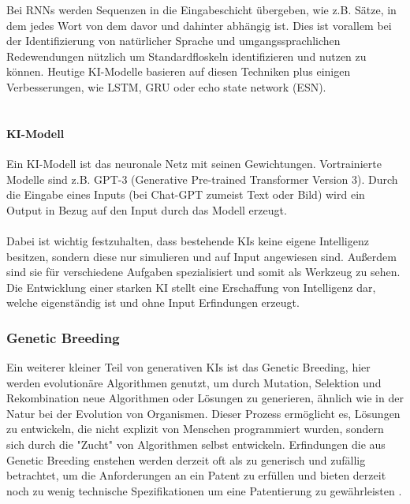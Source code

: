 Bei RNNs werden Sequenzen in die Eingabeschicht übergeben, 
wie z.B. Sätze, 
in dem jedes Wort von dem davor und dahinter abhängig ist. 
Dies ist vorallem bei der Identifizierung von natürlicher Sprache 
und umgangssprachlichen Redewendungen nützlich um  
Standardfloskeln identifizieren und nutzen zu können.
\cite{WasSindRekurrente2023}
Heutige KI-Modelle basieren auf diesen Techniken plus einigen Verbesserungen,
wie \gls{LSTM}, \gls{GRU} 
oder echo state network (ESN).
\\
\\
\paragraph{KI-Modell}
Ein KI-Modell ist das neuronale Netz mit seinen Gewichtungen. 
Vortrainierte Modelle sind z.B. GPT-3 (Generative Pre-trained Transformer Version 3).
\cite{KuenstlicheIntelligenzKI}
Durch die Eingabe eines Inputs (bei Chat-GPT zumeist Text oder Bild) 
wird ein Output in Bezug auf den Input durch das Modell erzeugt.
\\
\\
Dabei ist wichtig festzuhalten, dass bestehende KIs keine 
eigene Intelligenz besitzen, sondern diese nur simulieren 
und auf Input angewiesen sind. Außerdem sind sie für 
verschiedene Aufgaben spezialisiert und somit als Werkzeug zu sehen. 
Die Entwicklung einer starken KI stellt eine Erschaffung von Intelligenz dar,
welche eigenständig ist und ohne Input Erfindungen erzeugt.

\subsubsection{Genetic Breeding}
Ein weiterer kleiner Teil von generativen KIs ist das Genetic Breeding, 
hier werden evolutionäre Algorithmen genutzt, 
um durch Mutation, Selektion und Rekombination 
neue Algorithmen oder Lösungen zu generieren, 
ähnlich wie in der Natur bei der Evolution von Organismen.
Dieser Prozess ermöglicht es, Lösungen zu entwickeln, 
die nicht explizit von Menschen programmiert wurden, 
sondern sich durch die "Zucht" von Algorithmen 
selbst entwickeln.
Erfindungen die aus Genetic Breeding enstehen werden derzeit
oft als zu generisch und zufällig betrachtet, 
um die Anforderungen an ein Patent zu erfüllen und bieten
derzeit noch zu wenig technische Spezifikationen 
um eine Patentierung zu gewährleisten 
\cite{hartmannKuenstlicheIntelligenzIm2020}.

\newpage

